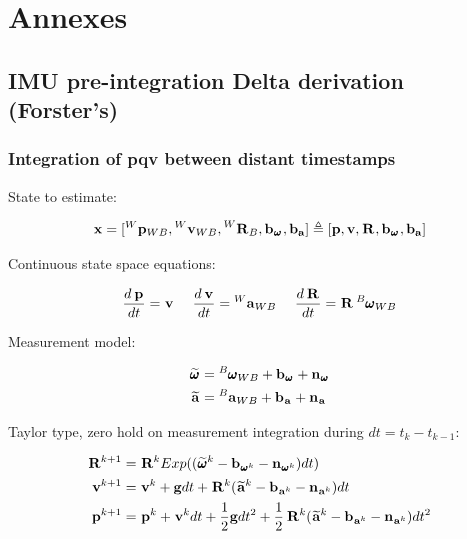 \documentclass[11pt]{article}
\newcommand{\Rot}[2]{\prescript{#1}{}{\bfR}_{#2}}
\newcommand{\noise}{\bfn}
\newcommand{\bias}{\bfb}
\newcommand{\posi}[2]{\prescript{#1}{}{\bfp}_{#2}}
\newcommand{\vel}[2]{\prescript{#1}{}{\bfv}_{#2}}
\newcommand{\acc}[2]{\prescript{#1}{}{\bfa}_{#2}}
\newcommand{\accm}[2]{\prescript{#1}{}{\widetilde{\bfa}}_{#2}}
\newcommand{\angvel}[2]{\prescript{#1}{}{\pmb{\omega}}_{#2}}
\newcommand{\angvelm}[2]{\prescript{#1}{}{\widetilde{\pmb{\omega}}}_{#2}}
\newcommand{\grav}{\bfg}
\begin{document}
\section{Annexes}
\subsection{IMU pre-integration Delta derivation (Forster's)}
\subsubsection{Integration of pqv between distant timestamps}
State to estimate:

\begin{equation*}
\bfx = [\posi{W}{WB}, \vel{W}{WB}, \Rot{W}{B}, \bias_{\angvel{}{}}, \bias_{\bfa}]
\triangleq 
[\bfp, \bfv, \Rot{}{}, \bias_{\angvel{}{}}, \bias_{\bfa}] 
\end{equation*}

Continuous state space equations:

\begin{equation*}
\frac{d\posi{}{}}{dt} = \vel{}{}  ~~~~ \frac{d\vel{}{}}{dt} = \acc{W}{WB} ~~~~ \frac{d\Rot{}{}}{dt} = \Rot{}{} \angvel{B}{WB} 
\end{equation*}

Measurement model:

\begin{equation*}
\begin{split}
\angvelm{}{} &= \angvel{B}{WB} + \bias_{\angvel{}{}} + \noise_{\angvel{}{}} 
\\
\accm{}{}    &= \acc{B}{WB} + \bias_{\acc{}{}} + \noise_{\acc{}{}} 
\end{split}
\end{equation*}


Taylor type, zero hold on measurement integration during $dt = t_k - t_{k-1}$:

\begin{equation*}
\begin{split}
\Rot{}{}^{k+1}  &= \Rot{}{}^{k}Exp((\angvelm{}{}^k - \bias_{\angvel{}{}^k} - \noise_{\angvel{}{}^k})dt)
\\
\vel{}{}^{k+1}  &= \vel{}{}^{k} + \grav dt + \Rot{}{}^{k}(\accm{}{}^k - \bias_{\acc{}{}^k} - \noise_{\acc{}{}^k})dt
\\
\posi{}{}^{k+1} &= \posi{}{}^{k} + \vel{}{}^{k}dt + \frac{1}{2}\grav dt^2 
+ \frac{1}{2}\Rot{}{}^{k}(\accm{}{}^k - \bias_{\acc{}{}^k} - \noise_{\acc{}{}^k})dt^2
\end{split}
\end{equation*}
\end{document}
